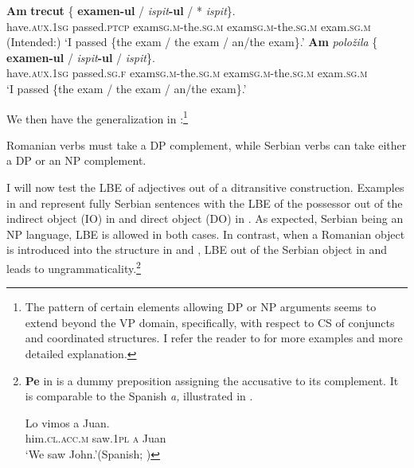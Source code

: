 \documentclass[output=paper,hidelinks,newtxmath,]{langscibook}
\begin{document}
\ea \label{15:ex20}
	\ea\label{15:ex20a}
    \gll \textbf{Am} \textbf{trecut} \{\hspace{-2pt} \textbf{examen-ul} / \textit{ispit}\textbf{-ul} /\hspace{0.1cm} *\hspace{-2pt} \textit{ispit}\hspace{1pt}\}.\\          
         have\textsc{.aux.1sg} passed\textsc{.ptcp} {} exam\textsc{sg.m}-the\textsc{.sg.m} {} exam\textsc{sg.m}-the\textsc{.sg.m} {} {} exam\textsc{.sg.m}\\
         \glt (Intended:) `I passed \{the exam / the exam / an/the exam\}.'
	\ex\label{15:ex20b}
    \gll \textbf{Am} \textit{položila} \{\hspace{-2pt} \textbf{examen-ul} / \textit{ispit}\textbf{-ul} / \textit{ispit}\hspace{1pt}\}.\\
         have\textsc{.aux.1sg} passed\textsc{.sg.f} {} exam\textsc{sg.m}-the\textsc{.sg.m} {} exam\textsc{sg.m}-the\textsc{.sg.m} {} exam\textsc{.sg.m}\\
         \glt `I passed \{the exam / the exam / an/the exam\}.'
	\z
\z

\noindent We then have the generalization in :\footnote{\label{15:fn10}The pattern of certain elements allowing DP or NP arguments seems to extend beyond the VP domain, specifically, with respect to CS of conjuncts and coordinated structures. I refer the reader to \citet{Petroj} for more examples and more detailed explanation.}

\ea\label{15:ex21}
  Romanian verbs must take a DP complement, while Serbian verbs can take either a DP or an NP complement.
\z

\noindent I will now test the LBE of adjectives out of a ditransitive construction. Examples in  and  represent fully Serbian sentences with the LBE of the possessor out of the indirect object (IO) in  and direct object (DO) in . As expected, Serbian being an NP language, LBE is allowed in both cases. In contrast, when a Romanian object is introduced into the structure in  and , LBE out of the Serbian object in  and  leads to ungrammaticality.\footnote{\label{15:fn11}\textbf{Pe} in  is a dummy preposition assigning the accusative to its complement. It is comparable to the Spanish \textit{a,} illustrated in .

\ea \gll Lo vimos a Juan.\label{15:fn11ex}\\
him\textsc{.cl.acc.m} saw\textsc{.1pl} \textsc{a} Juan\\
\glt `We saw John.'\hfill(Spanish; \citealt{Jaeggli1986})
\z }
\end{document}
